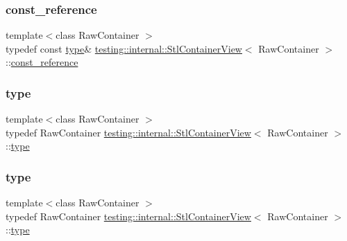 \subsubsection{\texorpdfstring{const\_reference}{const\_reference}\hspace{0.1cm}{\footnotesize\ttfamily [3/3]}}
{\footnotesize\ttfamily template$<$class Raw\+Container $>$ \\
typedef const \mbox{\hyperlink{classtesting_1_1internal_1_1_stl_container_view_a2b2c63a6dcdbfe63fb0ee121ebf463ba}{type}}\& \mbox{\hyperlink{classtesting_1_1internal_1_1_stl_container_view}{testing\+::internal\+::\+Stl\+Container\+View}}$<$ Raw\+Container $>$\+::\mbox{\hyperlink{classtesting_1_1internal_1_1_stl_container_view_a9cd4f6ed689b3938cdb7b3c4cbf1b36b}{const\+\_\+reference}}}

\mbox{\label{classtesting_1_1internal_1_1_stl_container_view_a2b2c63a6dcdbfe63fb0ee121ebf463ba}} 
\subsubsection{\texorpdfstring{type}{type}\hspace{0.1cm}{\footnotesize\ttfamily [1/3]}}
{\footnotesize\ttfamily template$<$class Raw\+Container $>$ \\
typedef Raw\+Container \mbox{\hyperlink{classtesting_1_1internal_1_1_stl_container_view}{testing\+::internal\+::\+Stl\+Container\+View}}$<$ Raw\+Container $>$\+::\mbox{\hyperlink{classtesting_1_1internal_1_1_stl_container_view_a2b2c63a6dcdbfe63fb0ee121ebf463ba}{type}}}

\mbox{\label{classtesting_1_1internal_1_1_stl_container_view_a2b2c63a6dcdbfe63fb0ee121ebf463ba}} 
\subsubsection{\texorpdfstring{type}{type}\hspace{0.1cm}{\footnotesize\ttfamily [2/3]}}
{\footnotesize\ttfamily template$<$class Raw\+Container $>$ \\
typedef Raw\+Container \mbox{\hyperlink{classtesting_1_1internal_1_1_stl_container_view}{testing\+::internal\+::\+Stl\+Container\+View}}$<$ Raw\+Container $>$\+::\mbox{\hyperlink{classtesting_1_1internal_1_1_stl_container_view_a2b2c63a6dcdbfe63fb0ee121ebf463ba}{type}}}

